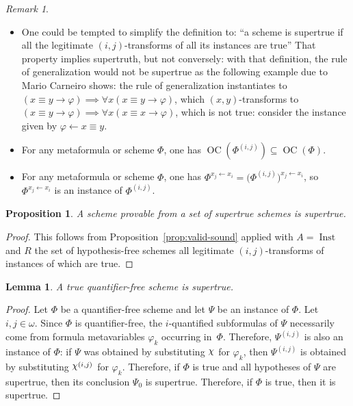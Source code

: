 \documentclass[11pt]{article}
\DeclareRobustCommand{\Chi}{{\mathpalette\irchi\relax}}
\newcommand*{\irchi}[2]{\raisebox{\depth}{$#1\chi$}}%
\newcommand*{\rimplies}{\implies}
\renewcommand*{\phi}{\varphi}
\DeclareMathOperator{\OC}{OC}
\DeclareMathOperator{\Inst}{Inst}
\theoremstyle{plain}
\newtheorem{proposition}[theorem]{Proposition}
\newtheorem{lemma}[theorem]{Lemma}
\theoremstyle{definition}
\theoremstyle{remark}
\newtheorem{remark}[theorem]{Remark}
\begin{document}
\begin{remark}
\begin{itemize}
\item
One could be tempted to simplify the definition to: ``a scheme is supertrue if all the legitimate $(i, j)$-transforms of all its instances are true''
That property implies supertruth, but not conversely: with that definition, the rule of generalization would not be supertrue as the following example due to Mario Carneiro shows: the rule of generalization instantiates to $(x \equiv y \to \phi) \rimplies \forall x (x \equiv y \to \phi)$, which $(x, y)$-transforms to $(x \equiv y \to \phi) \rimplies \forall x (x \equiv x \to \phi)$, which is not true: consider the instance given by $\phi \leftarrow x \equiv y$.

\item
For any metaformula or scheme $\Phi$, one has $\OC(\Phi^{(i, j)}) \subseteq \OC(\Phi)$.

\item
For any metaformula or scheme $\Phi$, one has $\Phi^{x_j \leftarrow x_i} = \bigl(\Phi^{(i, j)}\bigr)^{x_j \leftarrow x_i}$, so  $\Phi^{x_j \leftarrow x_i}$ is an instance of $\Phi^{(i, j)}$.
\end{itemize}
\end{remark}


\begin{proposition}\label{prop:prov}
A scheme provable from a set of supertrue schemes is supertrue.
\end{proposition}

\begin{proof}
This follows from Proposition~\ref{prop:valid-sound} applied with $A = \Inst$ and $R$ the set of hypothesis-free schemes all legitimate $(i, j)$-transforms of instances of which are true.
\end{proof}

\begin{lemma}
A true quantifier-free scheme is supertrue.
\end{lemma}

\begin{proof}
Let $\Phi$ be a quantifier-free scheme and let $\Psi$ be an instance of $\Phi$.
Let $i, j \in \omega$.
Since $\Phi$ is quantifier-free, the $i$-quantified subformulas of $\Psi$ necessarily come from
formula metavariables $\phi_k$ occurring in~$\Phi$.
Therefore, $\Psi^{(i, j)}$ is also an instance of $\Phi$: if $\Psi$ was obtained by substituting
$\Chi$ for $\phi_k$, then ${\Psi}^{(i, j)}$ is obtained by substituting $\Chi^{(i, j)}$ for $\phi_k$.
Therefore, if $\Phi$ is true and all hypotheses of $\Psi$ are supertrue, then its conclusion $\Psi_0$ is supertrue.
Therefore, if $\Phi$ is true, then it is supertrue.
\end{proof}
\end{document}
